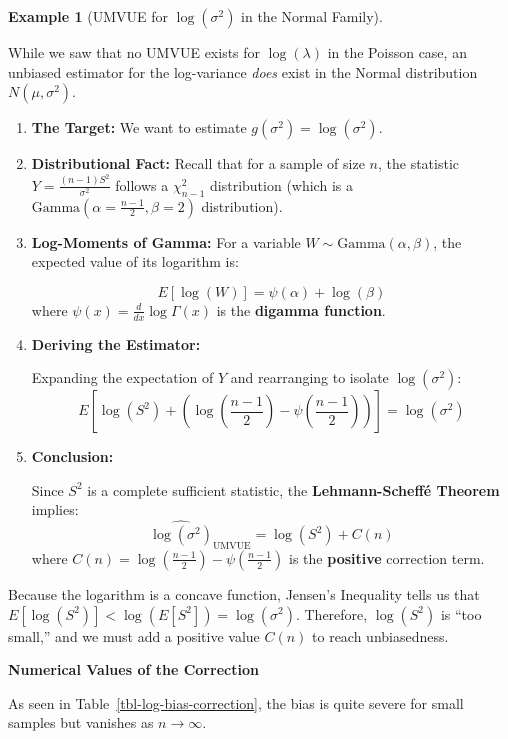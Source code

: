\documentclass[
  letterpaper,
  DIV=11,
  numbers=noendperiod]{scrreprt}
\renewcommand{\[}{\begin{equation}}
\renewcommand{\]}{\end{equation}}
\theoremstyle{definition}
\theoremstyle{plain}
\theoremstyle{plain}
\theoremstyle{plain}
\theoremstyle{definition}
\newtheorem{example}{Example}[chapter]
\theoremstyle{plain}
\theoremstyle{remark}
\begin{document}
\begin{example}[UMVUE for \(\log(\sigma^2)\) in the Normal
Family]\protect\hypertarget{exm-normal-log-variance}{}\label{exm-normal-log-variance}

While we saw that no UMVUE exists for \(\log(\lambda)\) in the Poisson
case, an unbiased estimator for the log-variance \emph{does} exist in
the Normal distribution \(N(\mu, \sigma^2)\).

\begin{enumerate}
\def\labelenumi{\arabic{enumi}.}
\item
  \textbf{The Target:} We want to estimate
  \(g(\sigma^2) = \log(\sigma^2)\).
\item
  \textbf{Distributional Fact:} Recall that for a sample of size \(n\),
  the statistic \(Y = \frac{(n-1)S^2}{\sigma^2}\) follows a
  \(\chi^2_{n-1}\) distribution (which is a
  \(\text{Gamma}(\alpha = \frac{n-1}{2}, \beta = 2)\) distribution).
\item
  \textbf{Log-Moments of Gamma:} For a variable
  \(W \sim \text{Gamma}(\alpha, \beta)\), the expected value of its
  logarithm is:

  \[E[\log(W)] = \psi(\alpha) + \log(\beta)\] where
  \(\psi(x) = \frac{d}{dx} \log \Gamma(x)\) is the \textbf{digamma
  function}.
\item
  \textbf{Deriving the Estimator:}

  Expanding the expectation of \(Y\) and rearranging to isolate
  \(\log(\sigma^2)\):
  \[E\left[ \log(S^2) + \left( \log\left(\frac{n-1}{2}\right) - \psi\left(\frac{n-1}{2}\right) \right) \right] = \log(\sigma^2)\]
\item
  \textbf{Conclusion:}

  Since \(S^2\) is a complete sufficient statistic, the
  \textbf{Lehmann-Scheffé Theorem} implies:
  \[\widehat{\log(\sigma^2)}_{\text{UMVUE}} = \log(S^2) + C(n)\] where
  \(C(n) = \log\left(\frac{n-1}{2}\right) - \psi\left(\frac{n-1}{2}\right)\)
  is the \textbf{positive} correction term.
\end{enumerate}

Because the logarithm is a concave function, Jensen's Inequality tells
us that \(E[\log(S^2)] < \log(E[S^2]) = \log(\sigma^2)\). Therefore,
\(\log(S^2)\) is ``too small,'' and we must add a positive value
\(C(n)\) to reach unbiasedness.

\textbf{Numerical Values of the Correction}

As seen in Table~\ref{tbl-log-bias-correction}, the bias is quite severe
for small samples but vanishes as \(n \to \infty\).


\end{example}
\end{document}
